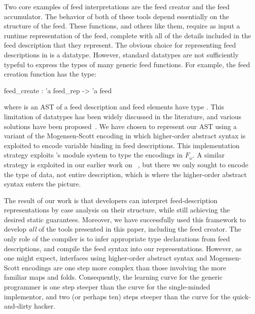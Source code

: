 
Two core examples of feed interpretations are the feed creator and the
feed accumulator. The behavior of both of these tools depend
essentially on the structure of the feed. These functions, and others
like them, require as input a runtime representation of the feed,
complete with all of the details included in the feed description that
they represent. The obvious choice for representing feed descriptions
in \ocaml is a datatype. However, standard \ocaml datatypes are not
sufficiently typeful to express the types of many generic feed
functions. For example, the feed creation function has the type:
\begin{code}
feed_create : 'a feed_rep -> 'a feed
\end{code} where  is an AST of a feed description and feed elements have type .
%
%
This limitation of datatypes has been widely discussed in the
literature, and various solutions have been 
proposed~\cite{yang:icfp98,weirich:encodingtypecase,hinz:icfp04,padsml-padl}. We have 
chosen to represent our AST using a variant of the Mogensen-Scott
encoding in which higher-order abstract syntax is exploited 
to encode variable binding in feed descriptions.  This implementation strategy 
exploits \ocaml's module system to type the encodings in $F_\omega$. 
A similar strategy is exploited in our earlier work on \padsml~\cite{padsml-padl}, 
but there we only sought to encode the \ocaml type of data, not entire \padsml
description, which is where the higher-order abstract syntax enters the picture.

The result of our work is that developers
can interpret feed-description representations by case analysis on
their structure, while still achieving the desired static
guarantees. Moreover, we have successfully used this framework to
develop {\it all} of the tools presented in this paper, including the
feed creator. The only role of the compiler is to infer appropriate
type declarations from feed descriptions, and compile the feed syntax
into our representations.  However, as one might expect, interfaces using
higher-order abstract syntax and Mogensen-Scott encodings are one step more
complex than those involving the more familiar maps and folds.  Consequently, the
learning curve for the generic programmer is one step steeper than
the curve for the single-minded implementor, and two (or perhaps ten) steps steeper
than the curve for the quick-and-dirty hacker.


